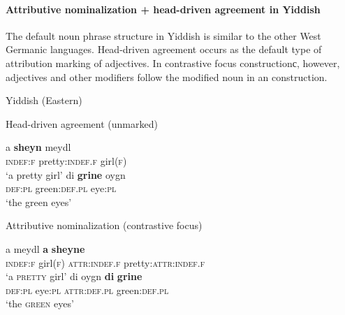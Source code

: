 \paragraph*{Attributive nominalization + head\hyp{}driven agreement in Yiddish}
\label{yiddish synchr}
The default noun phrase structure in Yiddish is similar to the other West Germanic languages. Head\hyp{}driven agreement occurs as the default type of attribution marking of adjectives. In contrastive focus constructionс, however, adjectives and other modifiers follow the modified noun in an  construction.
\begin{exe}
\ex \rm{Yiddish (Eastern) \citep[96]{jacobs-etal1994}}
\begin{xlist}
\ex \rm{Head\hyp{}driven agreement (unmarked)}
\begin{xlist}
\ex 
\gll	a \textbf{sheyn} meydl\\
	\textsc{indef:f} pretty:\textsc{indef.f} girl\textsc{(f)}\\
\glt	‘a pretty girl’
\ex
\gll	di \textbf{grine} oygn\\
	\textsc{def:pl} green:\textsc{def.pl} eye:\textsc{pl}\\
\glt	‘the green eyes’
\end{xlist}
\ex \rm{Attributive nominalization (contrastive focus)}
\begin{xlist}
\ex
\gll	a meydl \textbf{a} \textbf{sheyne}\\
	\textsc{indef:f} girl\textsc{(f)} \textsc{attr:indef.f} pretty:\textsc{attr:indef.f}\\
\glt	‘a \textsc{pretty} girl’
\ex
\gll	di oygn \textbf{di} \textbf{grine}\\
	\textsc{def:pl} eye:\textsc{pl} \textsc{attr:def.pl} green:\textsc{def.pl} \\
\glt	‘the \textsc{green} eyes’
\end{xlist}
\end{xlist}
\end{exe}

